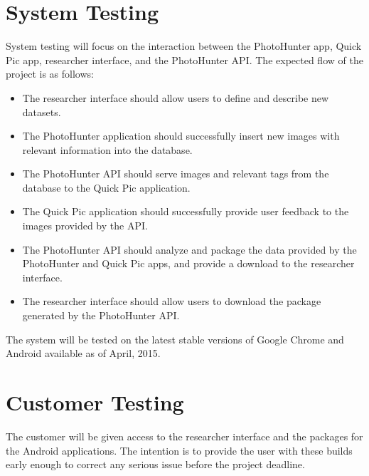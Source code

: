 \documentclass{article}
\begin{document}
\section{System Testing}
System testing will focus on the interaction between the PhotoHunter app, Quick Pic app, researcher interface, and the PhotoHunter API.
The expected flow of the project is as follows:
\begin{itemize}
\item The researcher interface should allow users to define and describe new datasets.
\item The PhotoHunter application should successfully insert new images with relevant information into the database.
\item The PhotoHunter API should serve images and relevant tags from the database to the Quick Pic application.
\item The Quick Pic application should successfully provide user feedback to the images provided by the API.
\item The PhotoHunter API should analyze and package the data provided by the PhotoHunter and Quick Pic apps, and provide a download to the researcher interface.
\item The researcher interface should allow users to download the package generated by the PhotoHunter API.
\end{itemize}

The system will be tested on the latest stable versions of Google Chrome and Android available as of April, 2015.

\section{Customer Testing}
The customer will be given access to the researcher interface and the packages for the Android applications. The intention is to provide the user with these builds early enough to correct any serious issue before the project deadline.
\end{document}
